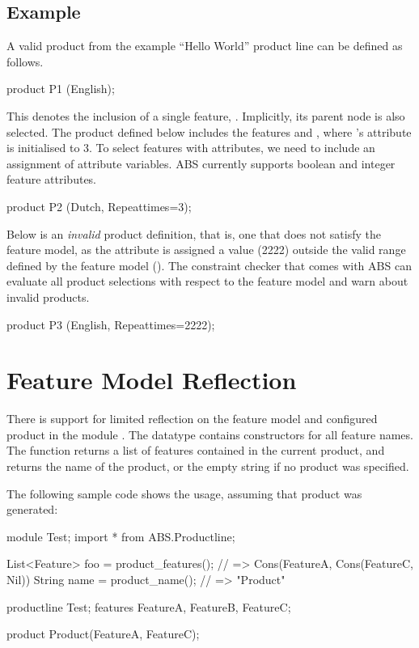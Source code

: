 \subsection{Example}
A valid product from the example ``Hello World'' product line can be defined as
follows.

\begin{abscode}
product P1 (English);
\end{abscode}
This denotes the inclusion of a single feature, . Implicitly,
its parent node is also selected. The product  defined below
includes the features  and , where
's attribute  is initialised to 3. To select
features with attributes, we need to include an assignment of attribute
variables. ABS currently supports boolean and integer feature attributes.
\begin{abscode}
product P2 (Dutch, Repeat{times=3});
\end{abscode}

Below is an \emph{invalid} product definition, that is, one that does not
satisfy the feature model, as the  attribute is assigned
a value (2222) outside the valid range defined by the feature model
(\absinline{[0 .. 1000]}). The constraint checker that comes with ABS can evaluate
all product selections with respect to the feature model and warn about invalid
products.
\begin{abscode}
product P3 (English, Repeat{times=2222});
\end{abscode}

\section{Feature Model Reflection}
\label{sec:feat-model-refl}

There is support for limited reflection on the feature model and configured
product in the module .  The datatype
 contains constructors for all feature names.  The function
 returns a list of features contained in the
current product, and  returns the name of the product,
or the empty string if no product was specified.

The following sample code shows the usage, assuming that product
 was generated:
\begin{abscode}
module Test;
import * from ABS.Productline;

{
  List<Feature> foo = product_features(); // => Cons(FeatureA, Cons(FeatureC, Nil)) 
  String name = product_name();           // => "Product"
}

productline Test;
features FeatureA, FeatureB, FeatureC;

product Product(FeatureA, FeatureC);
\end{abscode}

